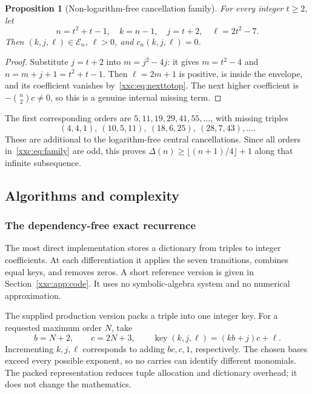 \documentclass[11pt,a4paper]{article}
\numberwithin{equation}{section}
\newtheorem{proposition}[theorem]{Proposition}
\theoremstyle{definition}
\theoremstyle{remark}
\theoremstyle{plain}
\begin{document}
\begin{proposition}[Non-logarithm-free cancellation family]\label{xxc:prop:family}
For every integer $t\ge2$, let
\begin{equation}\label{xxc:eq:family}
 n=t^2+t-1,\quad k=n-1,\quad j=t+2,\quad \ell=2t^2-7.
\end{equation}
Then $(k,j,\ell)\in\mathcal E_n$, $\ell>0$, and
$c_n(k,j,\ell)=0$.
\end{proposition}
\begin{proof}
Substitute $j=t+2$ into $m=j^2-4j$: it gives $m=t^2-4$ and
$n=m+j+1=t^2+t-1$. Then $\ell=2m+1$ is positive, is inside the envelope,
and its coefficient vanishes by~\eqref{xxc:eq:nexttotop}. The next higher
coefficient is $-\binom n2c\ne0$, so this is a genuine internal missing term.
\end{proof}

The first corresponding orders are $5,11,19,29,41,55,\ldots$, with missing
triples
\[
 (4,4,1),\ (10,5,11),\ (18,6,25),\ (28,7,43),\ldots.
\]
These are additional to the logarithm-free central cancellations. Since all
orders in~\eqref{xxc:eq:family} are odd, this proves
$\Delta(n)\ge\lfloor(n+1)/4\rfloor+1$ along that infinite subsequence.

\subsection{Algorithms and complexity}

\subsubsection{The dependency-free exact recurrence}

The most direct implementation stores a dictionary from triples to integer
coefficients. At each differentiation it applies the seven transitions,
combines equal keys, and removes zeros. A short reference version is given
in Section~\ref{xxc:app:code}. It uses no symbolic-algebra system and no
numerical approximation.

The supplied production version packs a triple into one integer key. For a
requested maximum order $N$, take
\[
 b=N+2,\qquad c=2N+3,\qquad \operatorname{key}(k,j,\ell)=(kb+j)c+\ell.
\]
Incrementing $k,j,\ell$ corresponds to adding $bc,c,1$, respectively. The
chosen bases exceed every possible exponent, so no carries can identify
different monomials. The packed representation reduces tuple allocation
and dictionary overhead; it does not change the mathematics.
\end{document}
